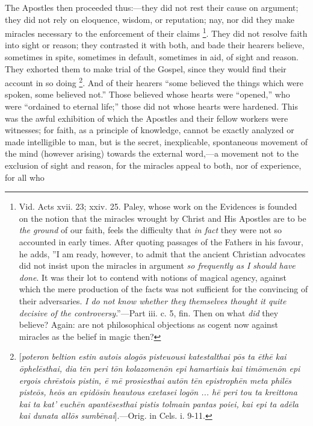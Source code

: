 The Apostles then proceeded thus:—they did not rest their cause
on argument; they did not rely on eloquence, wisdom, or reputation;
nay, nor did they make miracles necessary to the enforcement of their
claims \footnote{Vid. Acts xvii.
23; xxiv. 25. Paley, whose work on the Evidences is founded on the
notion that the miracles wrought by Christ and His Apostles are to be \emph{the
ground} of our faith, feels the difficulty that \emph{in fact} they
were not so accounted in early times. After quoting passages of the
Fathers in his favour, he adds, ''I am ready, however, to admit that
the ancient Christian advocates did not insist upon the miracles in
argument \emph{so frequently as I should have done}. It was their lot
to contend with notions of magical agency, against which the mere
production of the facts was not sufficient for the convincing of their
adversaries. \emph{I do not know whether they themselves thought it quite
decisive of the controversy}.''—Part iii. c. 5, fin. Then on
what \emph{did} they believe? Again: are not philosophical objections
as cogent now against miracles as the belief in magic then?}. They did not
resolve faith into sight or reason; they contrasted it with both, and
bade their hearers believe, sometimes in spite, sometimes in
default, sometimes in aid, of sight and reason. They exhorted them to
make trial of the Gospel, since they would find their account in so
doing \footnote{[\emph{poteron
beltion estin autois alog\={o}s pisteuousi katestalthai p\={o}s
ta \={e}th\={e} kai \={o}phel\={e}sthai, dia t\={e}n
peri t\={o}n kolazomen\={o}n epi hamartiais kai tim\={o}men\={o}n
epi ergois chr\={e}stois pistin, \={e} m\={e} prosiesthai aut\={o}n
t\={e}n epistroph\={e}n meta phil\={e}s piste\={o}s, he\={o}s
an epid\={o}sin heautous exetasei log\={o}n ... h\={e} peri
tou ta kreittona kai ta kat' euch\={e}n apant\={e}sesthai pistis
tolmain pantas poiei, kai epi ta ad\={e}la kai dunata all\={o}s
sumb\={e}nai}].—Orig. in Cels. i.
9-11.}. And of their
hearers ``some believed the things which were spoken, some
believed not.'' Those believed whose hearts were
``opened,'' who were ``ordained to eternal life;''
those did not whose hearts were hardened. This was the awful
exhibition of which the Apostles and their fellow workers were
witnesses; for faith, as a principle of knowledge, cannot be exactly
analyzed or made intelligible to man, but is the secret, inexplicable,
spontaneous movement of the mind (however arising) towards the
external word,—a movement not to the exclusion of sight and reason,
for the miracles appeal to both, nor of experience, for all who
